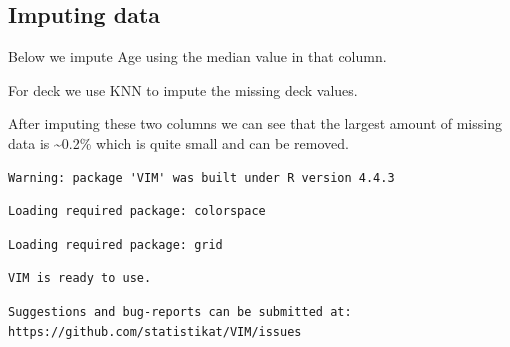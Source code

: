 \documentclass[
  letterpaper,
  DIV=11,
  numbers=noendperiod]{scrartcl}
\newenvironment{Shaded}{\begin{snugshade}}{\end{snugshade}}
\newcommand{\AttributeTok}[1]{\textcolor[rgb]{0.40,0.45,0.13}{#1}}
\newcommand{\CommentTok}[1]{\textcolor[rgb]{0.37,0.37,0.37}{#1}}
\newcommand{\ConstantTok}[1]{\textcolor[rgb]{0.56,0.35,0.01}{#1}}
\newcommand{\FunctionTok}[1]{\textcolor[rgb]{0.28,0.35,0.67}{#1}}
\newcommand{\NormalTok}[1]{\textcolor[rgb]{0.00,0.23,0.31}{#1}}
\newcommand{\OtherTok}[1]{\textcolor[rgb]{0.00,0.23,0.31}{#1}}
\newcommand{\SpecialCharTok}[1]{\textcolor[rgb]{0.37,0.37,0.37}{#1}}
\begin{document}
\subsection{Imputing data}\label{imputing-data}

Below we impute Age using the median value in that column.

For deck we use KNN to impute the missing deck values.

After imputing these two columns we can see that the largest amount of
missing data is \textasciitilde0.2\% which is quite small and can be
removed.

\begin{Shaded}
\end{Shaded}

\begin{verbatim}
Warning: package 'VIM' was built under R version 4.4.3
\end{verbatim}

\begin{verbatim}
Loading required package: colorspace
\end{verbatim}

\begin{verbatim}
Loading required package: grid
\end{verbatim}

\begin{verbatim}
VIM is ready to use.
\end{verbatim}

\begin{verbatim}
Suggestions and bug-reports can be submitted at: https://github.com/statistikat/VIM/issues
\end{verbatim}
\end{document}
